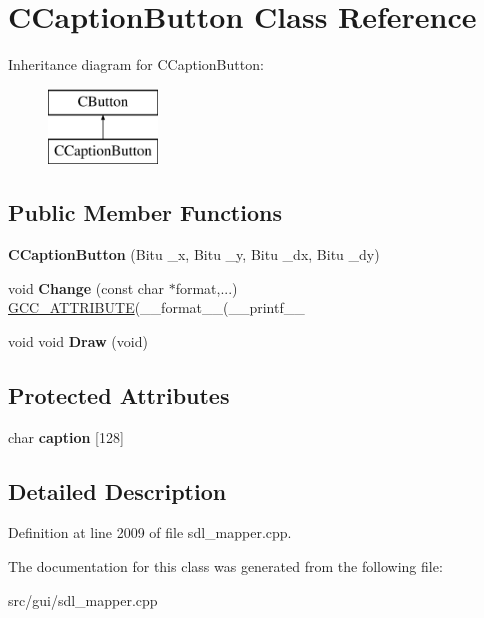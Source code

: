\hypertarget{classCCaptionButton}{\section{C\-Caption\-Button Class Reference}
\label{classCCaptionButton}
}
Inheritance diagram for C\-Caption\-Button\-:\begin{figure}[H]
\begin{center}
\leavevmode
\includegraphics[height=2.000000cm]{classCCaptionButton}
\end{center}
\end{figure}
\subsection*{Public Member Functions}
\begin{DoxyCompactItemize}
\item 
\hypertarget{classCCaptionButton_ab3693869d536d69e5a5c206f22865583}{{\bfseries C\-Caption\-Button} (Bitu \-\_\-x, Bitu \-\_\-y, Bitu \-\_\-dx, Bitu \-\_\-dy)}\label{classCCaptionButton_ab3693869d536d69e5a5c206f22865583}

\item 
\hypertarget{classCCaptionButton_a497661808a80201830f2241f75750e90}{void {\bfseries Change} (const char $\ast$format,...) \hyperlink{structGCC__ATTRIBUTE}{G\-C\-C\-\_\-\-A\-T\-T\-R\-I\-B\-U\-T\-E}(\-\_\-\-\_\-format\-\_\-\-\_\-(\-\_\-\-\_\-printf\-\_\-\-\_\-}\label{classCCaptionButton_a497661808a80201830f2241f75750e90}

\item 
\hypertarget{classCCaptionButton_a953f5b12ba13b61bc373fc3d25295079}{void void {\bfseries Draw} (void)}\label{classCCaptionButton_a953f5b12ba13b61bc373fc3d25295079}

\end{DoxyCompactItemize}
\subsection*{Protected Attributes}
\begin{DoxyCompactItemize}
\item 
\hypertarget{classCCaptionButton_a6e015cc9759137aa04d7c54bd936233b}{char {\bfseries caption} \mbox{[}128\mbox{]}}\label{classCCaptionButton_a6e015cc9759137aa04d7c54bd936233b}

\end{DoxyCompactItemize}


\subsection{Detailed Description}


Definition at line 2009 of file sdl\-\_\-mapper.\-cpp.



The documentation for this class was generated from the following file\-:\begin{DoxyCompactItemize}
\item 
src/gui/sdl\-\_\-mapper.\-cpp\end{DoxyCompactItemize}
